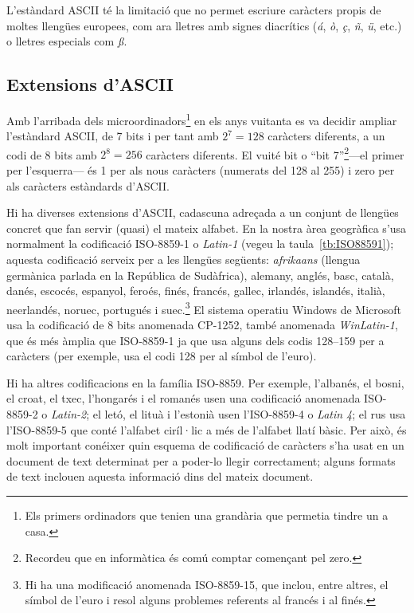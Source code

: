 L'estàndard ASCII té la limitació que no permet escriure caràcters
propis de moltes llengües europees, com ara lletres amb signes
diacrítics (\emph{á}, \emph{ò}, \emph{ç}, \emph{ñ}, \emph{ü}, etc.) o
lletres especials com \emph{ß}.


\subsection{Extensions d'ASCII} \label{s3:ISO}
Amb l'arribada dels microordinadors\footnote{Els primers ordinadors
  que tenien una grandària que permetia tindre un a casa.} en els anys
vuitanta es va decidir ampliar l'estàndard ASCII, de 7 bits i per tant
amb $2^7=128$ caràcters diferents, a un codi de 8 bits amb $2^8=256$
caràcters diferents. El vuité bit o ``bit 7''\footnote{Recordeu que en
  informàtica és comú comptar començant pel zero.}---el primer per
l'esquerra--- és 1 per als nous caràcters (numerats del 128 al 255) i
zero per als caràcters estàndards d'ASCII.

Hi ha diverses extensions d'ASCII, cadascuna adreçada a un conjunt de
llengües concret que fan servir (quasi) el mateix alfabet. En la
nostra àrea geogràfica s'usa normalment la codificació ISO-8859-1 o
\emph{Latin-1} (vegeu la taula~\ref{tb:ISO88591}); aquesta codificació
serveix per a les llengües següents: \emph{afrikaans} (llengua
germànica parlada en la República de Sudàfrica), alemany, anglés,
basc, català, danés, escocés, espanyol, feroés, finés, francés,
gallec, irlandés, islandés, italià, neerlandés, noruec, portugués i
suec.\footnote{Hi ha una modificació anomenada ISO-8859-15, que
  inclou, entre altres, el símbol de l'euro i resol alguns problemes
  referents al francés i al finés.}  El sistema operatiu Windows de
Microsoft usa la codificació de 8 bits anomenada CP-1252, també
anomenada \emph{WinLatin-1}, que és més àmplia que ISO-8859-1 ja que
usa alguns dels codis 128--159 per a caràcters (per exemple, usa el
codi 128 per al símbol de l'euro).

Hi ha altres codificacions en la família ISO-8859. Per exemple,
l'albanés, el bosni, el croat, el txec, l'hongarés i el romanés usen
una codificació anomenada ISO-8859-2 o \emph{Latin-2}; el letó, el
lituà i l'estonià usen l'ISO-8859-4 o \emph{Latin 4}; el rus usa
l'ISO-8859-5 que conté l'alfabet ciríl·lic a més de l'alfabet llatí
bàsic. Per això, és molt important conéixer quin esquema de
codificació de caràcters s'ha usat en un document de text determinat
per a poder-lo llegir correctament; alguns formats de text inclouen
aquesta informació dins del mateix document.

